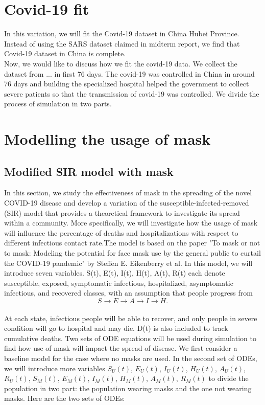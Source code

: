 \documentclass{article}
\begin{document}
 \section{Covid-19 fit}
 In this variation, we will fit the Covid-19 dataset in China Hubei Province. Instead of using the SARS dataset claimed in midterm report, we find that Covid-19 dataset in China is complete. \\

Now, we would like to discuss how we fit the covid-19 data. We collect the dataset from ... in first 76 days. The covid-19 was controlled in China in around 76 days and building the specialized hospital helped the government to collect severe patients so that the transmission of covid-19 was controlled. We divide the process of simulation in two parts.

\section{Modelling the usage of mask}
\subsection{Modified SIR model with mask}
In this section, we study the effectiveness of mask in the spreading of the novel COVID-19 disease and develop a variation of the susceptible-infected-removed (SIR) model that provides a theoretical framework to investigate its spread within a community. More specifically, we will investigate how the usage of mask will influence the percentage of deaths and hospitalizations with respect to different infectious contact rate.The model is based on the paper "To mask or not to mask: Modeling the potential for face mask use by the general public to curtail the COVID-19 pandemic" by Steffen E. Eikenberry et al. In this model, we will introduce seven variables. S(t), E(t), I(t), H(t), A(t), R(t) each denote susceptible, exposed, symptomatic infectious, hospitalized, asymptomatic infectious, and recovered classes, with an assumption that people progress from \\
$$S \rightarrow E \rightarrow A \rightarrow I \rightarrow H. $$ \\
At each state, infectious people will be able to recover, and only people in severe condition will go to hospital and may die. D(t) is also included to track cumulative deaths. Two sets of ODE equations will be used during simulation to find how use of mask will impact the spread of disease. We first consider a baseline model for the case where no masks are used. In the second set of ODEs, we will introduce more variables
$S_{U}(t)$, $E_{U}(t)$, $I_{U}(t)$, $H_{U}(t)$, $A_{U}(t)$, $R_{U}(t)$, $S_{M}(t)$, $E_{M}(t)$, $I_{M}(t)$, $H_{M}(t)$, $A_{M}(t)$, $R_{M}(t)$ to divide the population in two part: the population wearing masks and the one not wearing masks.
Here are the two sets of ODEs:\\
\end{document}
